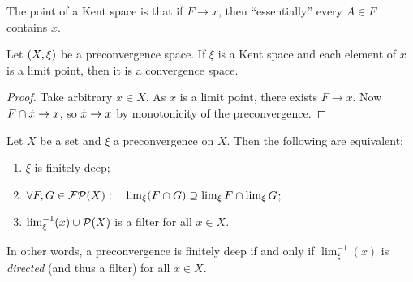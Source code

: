 The point of a Kent space is that if $F\to x$, then ``essentially'' every $A\in F$ contains $x$.

\begin{lemma}
Let $\sSet{X,\xi}$ be a preconvergence space. If $\xi$ is a Kent space and each element of $x$ is a limit point, then it is a convergence space.
\end{lemma}
\begin{proof}
Take arbitrary $x\in X$. As $x$ is a limit point, there exists $F\to x$. Now $F\cap \dot{x} \to x$, so $\dot{x} \to x$ by monotonicity of the preconvergence.
\end{proof}

\begin{lemma} \label{finiteDepthLemma}
Let $X$ be a set and $\xi$ a preconvergence on $X$. Then the following are equivalent:
\begin{enumerate}
\item $\xi$ is finitely deep;
\item $\forall F,G \in \operatorname{\mathcal{FP}}(X): \quad \lim_\xi(F\cap G) \supseteq \lim_\xi F \cap \lim_\xi G$;
\item $\lim_\xi^{-1}(x)\cup \operatorname{\mathcal{P}}(X)$ is a filter for all $x\in X$.
\end{enumerate}
\end{lemma}
In other words, a preconvergence is finitely deep \textup{if and only if} $\lim_\xi^{-1}(x)$ is \emph{directed} (and thus a filter) for all $x\in X$.

